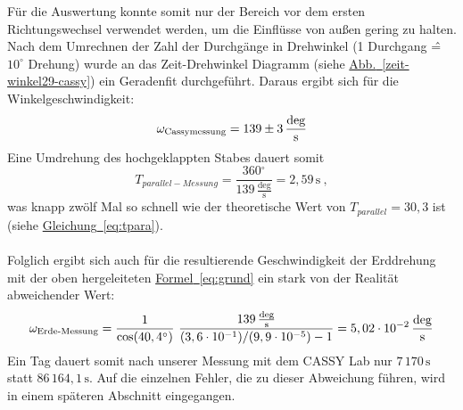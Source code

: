 \documentclass[11pt]{scrartcl}
\newcommand{\unit}[1]{\ensuremath{\,\mathrm{#1}}} %
\newcommand{\degr}{\ensuremath{^\circ}}
\newcommand{\ee}[1]{\ensuremath{\cdot 10^{#1}}}
\newcommand{\ltext}[1]{\ensuremath{_{\textnormal{#1}}}}
\newcommand{\hypref}[2]{\hyperref[#2]{{#1}~\ref{#2}}}
\begin{document}
F\"ur die Auswertung konnte somit nur der Bereich vor dem ersten Richtungswechsel verwendet werden, um die Einfl\"usse von au\ss{}en gering zu halten. Nach dem Umrechnen der Zahl der Durchg\"ange in Drehwinkel (1 Durchgang \^{=} $10^\circ$ Drehung) wurde an das \glqq Zeit-Drehwinkel\grqq{} Diagramm (siehe \hypref{Abb.}{zeit-winkel29-cassy}) ein Geradenfit durchgef\"uhrt. Daraus ergibt sich f\"ur die Winkelgeschwindigkeit:
\begin{equation}
\omega\ltext{Cassymessung} = 139\pm 3 \unit{\frac{deg}{s}}
\end{equation}
Eine Umdrehung des hochgeklappten Stabes dauert somit 
\begin{equation}
T_{parallel-Messung}=\frac{360\degr}{139 \unit{\frac{deg}{s}}}=2,59 \unit{s} \ ,
\end{equation}
was knapp zwölf Mal so schnell wie der theoretische Wert von $T_{parallel}= 30,3$ ist (siehe \hypref{Gleichung}{eq:tpara}).\\ \\
Folglich ergibt sich auch f\"ur die resultierende Geschwindigkeit der Erddrehung mit der oben hergeleiteten \hypref{Formel}{eq:grund} ein stark von der Realit\"at abweichender Wert:
\begin{equation}
\omega\ltext{Erde-Messung} = 
\frac{1}{\cos(40,4\degr)}\ 
\frac{139 \unit{\frac{deg}{s}}}{(3,6\ee{-1}) / (9,9\ee{-5}) - 1}
= 5,02\ee{-2} \unit{\frac{deg}{s}}
\end{equation}
Ein Tag dauert somit nach unserer Messung mit dem CASSY Lab nur $7\,170 \unit{s}$ statt $86\,164,1 \unit{s}$. Auf die einzelnen Fehler, die zu dieser Abweichung f\"uhren, wird in einem sp\"ateren Abschnitt eingegangen.

\FloatBarrier
\end{document}
